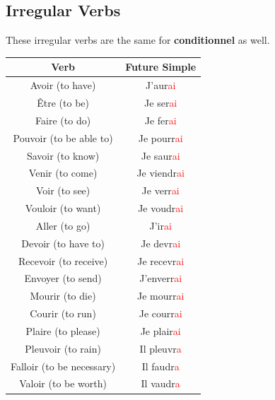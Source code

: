 \documentclass{book}
\begin{document}
\subsection{Irregular Verbs}
These irregular verbs are the same for \textbf{conditionnel} as well.
\begin{center}
    \begin{tabular}{|c|c|}
        \hline
        \textbf{Verb} & \textbf{Future Simple} \\
        \hline
        Avoir (to have) & J'aur\textcolor{red}{ai} \\
        \hline
        Être (to be) & Je ser\textcolor{red}{ai} \\
        \hline
        Faire (to do) & Je fer\textcolor{red}{ai} \\
        \hline
        Pouvoir (to be able to) & Je pourr\textcolor{red}{ai} \\
        \hline
        Savoir (to know) & Je saur\textcolor{red}{ai} \\
        \hline
        Venir (to come) & Je viendr\textcolor{red}{ai} \\
        \hline
        Voir (to see) & Je verr\textcolor{red}{ai} \\
        \hline
        Vouloir (to want) & Je voudr\textcolor{red}{ai} \\
        \hline
        Aller (to go) & J'ir\textcolor{red}{ai} \\
        \hline
        Devoir (to have to) & Je devr\textcolor{red}{ai} \\
        \hline
        Recevoir (to receive) & Je recevr\textcolor{red}{ai} \\
        \hline
        Envoyer (to send) & J'enverr\textcolor{red}{ai} \\
        \hline
        Mourir (to die) & Je mourr\textcolor{red}{ai} \\
        \hline
        Courir (to run) & Je courr\textcolor{red}{ai} \\
        \hline
        Plaire (to please) & Je plair\textcolor{red}{ai} \\
        \hline
        Pleuvoir (to rain) & Il pleuvr\textcolor{red}{a} \\
        \hline
        Falloir (to be necessary) & Il faudr\textcolor{red}{a} \\
        \hline
        Valoir (to be worth) & Il vaudr\textcolor{red}{a} \\
        \hline
    \end{tabular}
\end{center}
\end{document}

